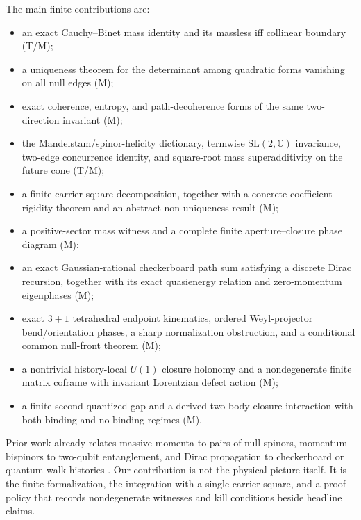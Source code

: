 \documentclass[11pt]{article}
\newcommand{\Mtag}{\textcolor{verified}{\textsc{M}}}
\newcommand{\Ttag}{\textcolor{external}{\textsc{T}}}
\newcommand{\C}{\mathbb{C}}
\begin{document}
The main finite contributions are:
\begin{itemize}[leftmargin=1.5em]
  \item an exact Cauchy--Binet mass identity and its massless iff collinear
        boundary (\Ttag/\Mtag);
  \item a uniqueness theorem for the determinant among quadratic forms
        vanishing on all null edges (\Mtag);
  \item exact coherence, entropy, and path-decoherence forms of the same
        two-direction invariant (\Mtag);
  \item the Mandelstam/spinor-helicity dictionary, termwise
        $\mathrm{SL}(2,\C)$ invariance, two-edge concurrence identity, and
        square-root mass superadditivity on the future cone (\Ttag/\Mtag);
  \item a finite carrier-square decomposition, together with a concrete
        coefficient-rigidity theorem and an abstract non-uniqueness result
        (\Mtag);
  \item a positive-sector mass witness and a complete finite
        aperture--closure phase diagram (\Mtag);
  \item an exact Gaussian-rational checkerboard path sum satisfying a discrete
        Dirac recursion, together with its exact quasienergy relation and
        zero-momentum eigenphases (\Mtag);
  \item exact $3+1$ tetrahedral endpoint kinematics, ordered Weyl-projector
        bend/orientation phases, a sharp normalization obstruction, and a
        conditional common null-front theorem (\Mtag);
  \item a nontrivial history-local $U(1)$ closure holonomy and a nondegenerate
        finite matrix coframe with invariant Lorentzian defect action (\Mtag);
  \item a finite second-quantized gap and a derived two-body closure interaction
        with both binding and no-binding regimes (\Mtag).
\end{itemize}

Prior work already relates massive momenta to pairs of null spinors, momentum
bispinors to two-qubit entanglement, and Dirac propagation to checkerboard or
quantum-walk histories \cite{ElvangHuang,ArkaniHamedMassive,ChinLee,FeynmanHibbs,JacobsonSchulman}.
Our contribution is not the physical picture itself.  It is the finite
formalization, the integration with a single carrier square, and a proof policy
that records nondegenerate witnesses and kill conditions beside headline
claims.
\end{document}
